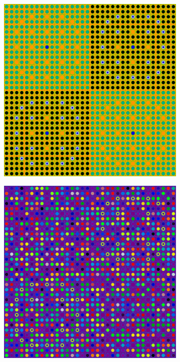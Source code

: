 \begin{figure}[h!]
\begin{subfigure}{.5\textwidth}
  \caption{}
  \label{fig:chap8-assm-16-degenerate-materials}
\end{subfigure}
\begin{subfigure}{.5\textwidth}
  \centering
  \includegraphics[width=0.9\linewidth]{figures/quantification/homogenization/2x2-null-materials}
  \caption{}
  \label{fig:chap8-2x2-null-materials}
\end{subfigure}%
\begin{subfigure}{.5\textwidth}
  \centering
  \includegraphics[width=0.9\linewidth]{figures/quantification/homogenization/2x2-degenerate-materials}

\end{subfigure}
\end{figure}
